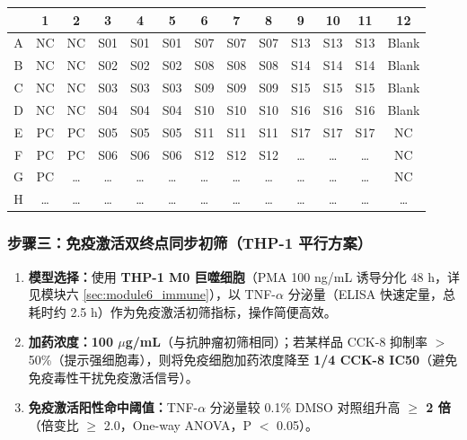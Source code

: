 \documentclass[12pt,a4paper,twoside]{article}
\begin{document}
\begin{center}
\begin{tabular}{ccccccccccccc}
\toprule
 & \textbf{1} & \textbf{2} & \textbf{3} & \textbf{4} & \textbf{5} & \textbf{6} & \textbf{7} & \textbf{8} & \textbf{9} & \textbf{10} & \textbf{11} & \textbf{12} \\
\midrule
A & NC & NC & S01 & S01 & S01 & S07 & S07 & S07 & S13 & S13 & S13 & Blank \\
B & NC & NC & S02 & S02 & S02 & S08 & S08 & S08 & S14 & S14 & S14 & Blank \\
C & NC & NC & S03 & S03 & S03 & S09 & S09 & S09 & S15 & S15 & S15 & Blank \\
D & NC & NC & S04 & S04 & S04 & S10 & S10 & S10 & S16 & S16 & S16 & Blank \\
E & PC & PC & S05 & S05 & S05 & S11 & S11 & S11 & S17 & S17 & S17 & NC \\
F & PC & PC & S06 & S06 & S06 & S12 & S12 & S12 & \ldots & \ldots & \ldots & NC \\
G & PC & \ldots & \ldots & \ldots & \ldots & \ldots & \ldots & \ldots & \ldots & \ldots & \ldots & NC \\
H & \ldots & \ldots & \ldots & \ldots & \ldots & \ldots & \ldots & \ldots & \ldots & \ldots & \ldots & \ldots \\
\bottomrule
\end{tabular}
\label{tab:hts_plate_layout}
\end{center}

\subsubsection{步骤三：免疫激活双终点同步初筛（THP-1 平行方案）}

\begin{enumerate}
  \item \textbf{模型选择：}使用 \textbf{THP-1 M0 巨噬细胞}（PMA 100 ng/mL 诱导分化 48 h，详见模块六 \ref{sec:module6_immune}），以 TNF-$\alpha$ 分泌量（ELISA 快速定量，总耗时约 2.5 h）作为免疫激活初筛指标，操作简便高效。
  \item \textbf{加药浓度：}\textbf{100 $\mu$g/mL}（与抗肿瘤初筛相同）；若某样品 CCK-8 抑制率 $>$ 50\%（提示强细胞毒），则将免疫细胞加药浓度降至 \textbf{1/4 CCK-8 IC50}（避免免疫毒性干扰免疫激活信号）。
  \item \textbf{免疫激活阳性命中阈值：}TNF-$\alpha$ 分泌量较 0.1\% DMSO 对照组升高 \textbf{$\geq$ 2 倍}（倍变比 $\geq$ 2.0，One-way ANOVA，P $<$ 0.05）。
\end{enumerate}
\end{document}
